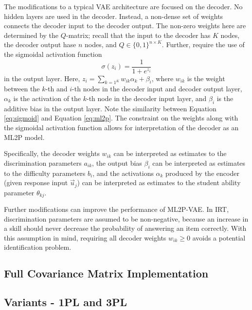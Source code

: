 The modifications to a typical VAE architecture are focused on the decoder. No hidden layers are used in the decoder. Instead, a non-dense set of weights connects the decoder input to the decoder output. The non-zero weights here are determined by the $Q$-matrix; recall that the input to the decoder has $K$ nodes, the decoder output hase $n$ nodes, and $Q \in \{0,1\}^{n \times K}$. Further, require the use of the sigmoidal activation function
\begin{equation}
  \sigma(z_i) = \frac{1}{1 + e^{z_i}}
  \label{eq:sigmoid}
\end{equation}
in the output layer. Here, $z_i = \sum_{k=1^K} w_{ik}\alpha_{k} + \beta_i$, where $w_{ik}$ is the weight between the $k$-th and $i$-th nodes in the decoder input and decoder output layer, $\alpha_k$ is the activation of the $k$-th node in the decoder input layer, and $\beta_i$ is the additive bias in the output layer. Note the similarity between Equation \ref{eq:sigmoid} and Equation \ref{eq:ml2p}. The constraint on the weights along with the sigmoidal activation function allows for interpretation of the decoder as an ML2P model.

Specifically, the decoder weights $w_{ik}$ can be interpreted as estimates to the discrimination parameters $a_{ik}$, the output bias $\beta_i$ can be interpreted as estimates to the difficulty parameters $b_i$, and the activations $\alpha_k$ produced by the encoder (given response input $\vec u_j$) can be interpreted as estimates to the student ability parameter $\theta_{kj}$. 

Further modifications can improve the performance of ML2P-VAE. In IRT, discrimination parameters are assumed to be non-negative, because an increase in a skill should never decrease the probability of answering an item correctly. With this assumption in mind, requiring all decoder weights $w_{ik} \geq 0$ avoids a potential identification problem. 

\subsection{Full Covariance Matrix Implementation}

\subsection{Variants - 1PL and 3PL}

